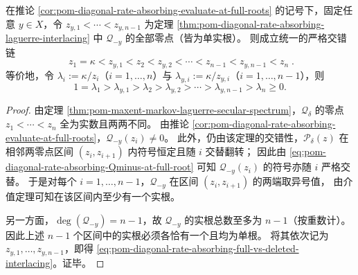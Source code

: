 \begin{theorem}[全谱与删点谱的严格交错链]\label{thm:pom-diagonal-rate-absorbing-full-vs-deleted-interlacing}
在推论 \ref{cor:pom-diagonal-rate-absorbing-evaluate-at-full-roots} 的记号下，固定任意 \(y\in X\)，令
\(
z_{y,1}<\cdots<z_{y,n-1}
\)
为定理 \ref{thm:pom-diagonal-rate-absorbing-laguerre-interlacing} 中 \(\mathcal Q_{-y}\) 的全部零点（皆为单实根）。
则成立统一的严格交错链
\begin{equation}\label{eq:pom-diagonal-rate-absorbing-full-vs-deleted-interlacing}
\boxed{\;
z_1=\kappa<z_{y,1}<z_2<z_{y,2}<\cdots<z_{n-1}<z_{y,n-1}<z_n\; } .
\end{equation}
等价地，令 \(\lambda_i:=\kappa/z_i\)（\(i=1,\dots,n\)）与 \(\lambda_{y,i}:=\kappa/z_{y,i}\)（\(i=1,\dots,n-1\)），则
\[
1=\lambda_1>\lambda_{y,1}>\lambda_2>\lambda_{y,2}>\cdots>\lambda_{y,n-1}>\lambda_n\ge 0.
\]
\end{theorem}
\begin{proof}
由定理 \ref{thm:pom-maxent-markov-laguerre-secular-spectrum}，\(\mathcal Q_\delta\) 的零点 \(z_1<\cdots<z_n\) 全为实数且两两不同。
由推论 \ref{cor:pom-diagonal-rate-absorbing-evaluate-at-full-roots}，\(\mathcal Q_{-y}(z_i)\ne 0\)。
此外，仍由该定理的交错性，\(\mathcal P_\delta(z)\) 在相邻两零点区间 \((z_i,z_{i+1})\) 内符号恒定且随 \(i\) 交替翻转；
因此由 \eqref{eq:pom-diagonal-rate-absorbing-Qminus-at-full-root} 可知 \(\mathcal Q_{-y}(z_i)\) 的符号亦随 \(i\) 严格交替。
于是对每个 \(i=1,\dots,n-1\)，\(\mathcal Q_{-y}\) 在区间 \((z_i,z_{i+1})\) 的两端取异号值，
由介值定理可知在该区间内至少有一个实根。
\par
另一方面，\(\deg(\mathcal Q_{-y})=n-1\)，故 \(\mathcal Q_{-y}\) 的实根总数至多为 \(n-1\)（按重数计）。
因此上述 \(n-1\) 个区间中的实根必须各恰有一个且均为单根。
将其依次记为 \(z_{y,1},\dots,z_{y,n-1}\)，即得 \eqref{eq:pom-diagonal-rate-absorbing-full-vs-deleted-interlacing}。证毕。
\end{proof}

\endinput

